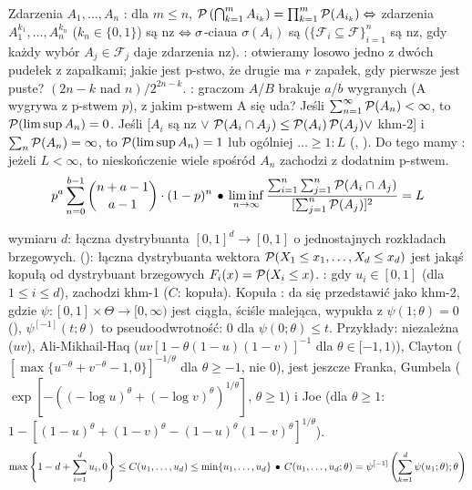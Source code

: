 Zdarzenia  $A_1, \ldots, A_n$ : dla $m \le n$, $\operatorname{\mathcal{P}} \left(\bigcap_{k=1}^m A_{i_k}\right) = \prod_{k=1}^m \operatorname{\mathcal{P}} (A_{i_k}) \Leftrightarrow$ zdarzenia $A_1^{k_1}, \ldots, A_n^{k_n}$ ($k_n \in \{0,1\}$) są nz $\Leftrightarrow \sigma$-ciaua $\sigma (A_i)$ są  ($\{\mathcal F_i \subseteq \mathcal F\}_{i=1}^n$ są nz, gdy każdy wybór $A_j \in \mathcal F_j$ daje zdarzenia nz).
: otwieramy losowo jedno z dwóch pudełek z zapałkami; jakie jest p-stwo, że drugie ma $r$ zapałek, gdy pierwsze jest puste? $(2n-k \mbox{ nad } n)/2^{2n - k}$.
: graczom $A$/$B$ brakuje $a$/$b$ wygranych (A wygrywa z p-stwem $p$), z jakim p-stwem A się uda?
Jeśli $\sum_{n=1}^\infty \operatorname{\mathcal{P}} (A_n) < \infty$, to $\operatorname{\mathcal{P}} (\limsup A_n) = 0$.
Jeśli [$A_i$ są nz $\vee$ $\operatorname{\mathcal{P}} (A_i \cap A_j) \le \operatorname{\mathcal{P}} (A_i) \operatorname{\mathcal{P}} (A_j) \vee$ khm-2] i $\sum_n \operatorname{\mathcal{P}} (A_n) = \infty$, to $\operatorname{\mathcal{P}} (\limsup A_n) = 1$ lub ogólniej $\ldots \ge 1 : L$ (, ). 
Do tego mamy : jeżeli $L < \infty$, to nieskończenie wiele spośród $A_n$ zachodzi z dodatnim p-stwem.
\[
 	p^a \sum_{n=0}^{b-1} {n+a-1 \choose a-1} \cdot (1-p)^n \, \bullet \,
 	\liminf_{n\to\infty} \frac {\sum_{i=1}^n \sum_{j=1}^n \operatorname{\mathcal{P}} (A_i \cap A_j)}{[\sum_{j=1}^n \operatorname{\mathcal{P}} (A_j)]^2} = L
\]

 wymiaru $d$: łączna dystrybuanta $[0,1]^d \to [0,1]$ o jednostajnych rozkładach brzegowych.
 (): łączna dystrybuanta wektora $\operatorname{\mathcal{P}}(X_1 \le x_1, \ldots, X_d \le x_d)$ jest jakąś kopułą od dystrybuant brzegowych $F_i(x) = \operatorname{\mathcal{P}} (X_i \le x)$.
: gdy $u_i \in [0,1]$ (dla $1 \le i \le d$), zachodzi khm-1 ($C$: kopuła).
Kopuła : da się przedstawić jako khm-2, gdzie $\psi \colon [0,1] \times \Theta \to [0, \infty)$ jest ciągła, ściśle malejąca, wypukła z $\psi(1; \theta) = 0$ (), $\psi^{[-1]}(t; \theta)$ to pseudoodwrotność: $0$ dla $\psi(0; \theta) \le t$.
Przykłady: niezależna ($uv$), Ali-Mikhail-Haq ($uv[1-\theta(1-u)(1-v)]^{-1}$ dla $\theta \in [-1, 1)$), Clayton ($[\max \{u^{-\theta} + v^{-\theta} - 1, 0\}]^{- 1 / \theta}$ dla $\theta \ge -1$, nie $0$), jest jeszcze Franka, Gumbela ($\exp [-((-\log u)^\theta + (-\log v)^\theta)^{1/\theta}]$, $\theta \ge 1$) i Joe (dla $\theta \ge 1$: $1 - [(1 - u)^\theta + (1-v)^\theta - (1-u)^\theta(1-v)^\theta]^{1 / \theta}$).
\[
	\max \left\{1 - d + \sum_{i=1}^d u_i, 0 \right\} \le C(u_1, \ldots, u_d) \le \min \{u_1, \ldots, u_d\} \, \bullet \,
    C(u_1,\dots,u_d;\theta) = \psi^{[-1]}\left(\sum_{k=1}^d \psi(u_1;\theta); \theta\right)
\]
